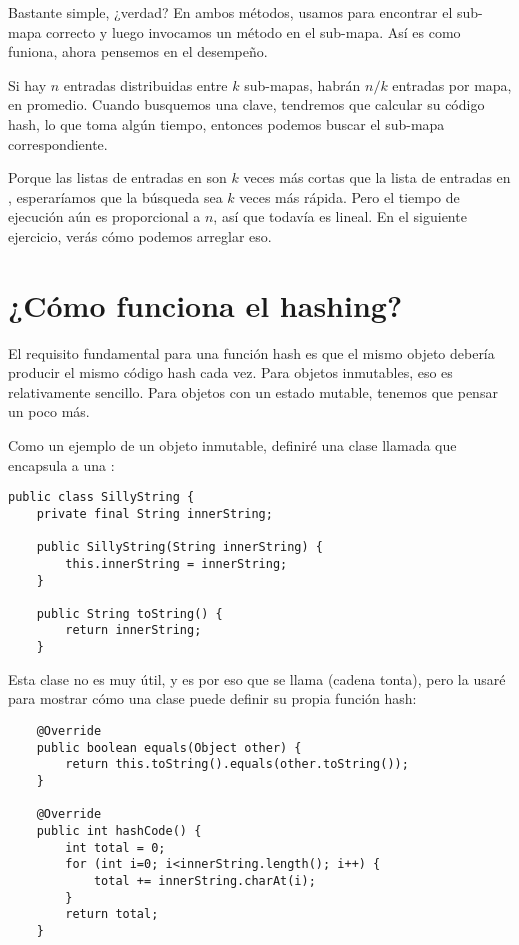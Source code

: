 \documentclass[12pt]{book}
\theoremstyle{exercise}
\begin{document}
Bastante simple, ¿verdad? En ambos métodos, usamos  para encontrar
el sub-mapa correcto y luego invocamos un método en el sub-mapa.
Así es como funiona, ahora pensemos en el desempeño.


Si hay $n$ entradas distribuidas entre $k$ sub-mapas,
habrán $n/k$ entradas por mapa, en promedio. Cuando busquemos
una clave, tendremos que calcular su código hash, lo que toma algún
tiempo, entonces podemos buscar el sub-mapa correspondiente.

Porque las listas de entradas en
 son $k$ veces más cortas que la lista de entradas en
, esperaríamos que la búsqueda sea $k$ veces
más rápida. Pero el tiempo de ejecución aún es proporcional a $n$, así
que  todavía es lineal. En el siguiente ejercicio, verás
cómo podemos arreglar eso.



\section{¿Cómo funciona el hashing?}
\label{how-does-hashing-work}

El requisito fundamental para una función hash es que el mismo objeto
debería producir el mismo código hash cada vez. Para objetos inmutables,
eso es relativamente sencillo. Para objetos con un estado mutable,
tenemos que pensar un poco más.


Como un ejemplo de un objeto inmutable, definiré una clase llamada
 que encapsula a una :

\begin{verbatim}
public class SillyString {
    private final String innerString;

    public SillyString(String innerString) {
        this.innerString = innerString;
    }

    public String toString() {
        return innerString;
    }
\end{verbatim}

Esta clase no es muy útil, y es por eso que se llama  (cadena tonta),
pero la usaré para mostrar cómo una clase puede definir su propia función hash:

\begin{verbatim}
    @Override
    public boolean equals(Object other) {
        return this.toString().equals(other.toString());
    }
    
    @Override
    public int hashCode() {
        int total = 0;
        for (int i=0; i<innerString.length(); i++) {
            total += innerString.charAt(i);
        }
        return total;
    }
\end{verbatim}
\end{document}
